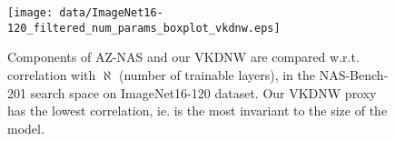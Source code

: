 
\begin{figure}
    \centering    
    \texttt{[image: data/ImageNet16-120\_filtered\_num\_params\_boxplot\_vkdnw.eps]}
    \caption{Components of AZ-NAS \cite{lee2024az} and our VKDNW are compared w.r.t. correlation with $\aleph$ (number of trainable layers), in the NAS-Bench-201 search space \cite{dong2020bench} on ImageNet16-120 \cite{chrabaszcz2017downsampled} dataset. Our VKDNW proxy has the lowest correlation, ie. is the most invariant to the size of the model.\vspace{-15pt}}
    
    \label{fig:boxplot_per_trainable_layers}
\end{figure}